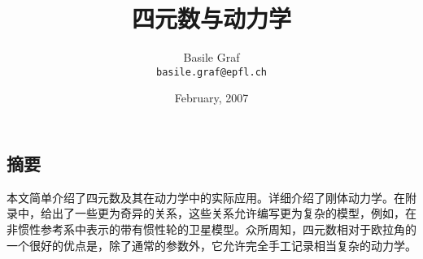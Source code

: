 \documentclass{article}
\renewcommand{\v}{\vec}
\begin{document}
\begin{CJK*}{UTF8}{gbsn}
%

\title{四元数与动力学}
\author{Basile Graf \\ \texttt{basile.graf@epfl.ch}}
\date{February, 2007}
\maketitle
\thispagestyle{empty}

\subsection*{摘要}
本文简单介绍了四元数及其在动力学中的实际应用。详细介绍了刚体动力学。在附录中，给出了一些更为奇异的关系，这些关系允许编写更为复杂的模型，例如，在非惯性参考系中表示的带有惯性轮的卫星模型。众所周知，四元数相对于欧拉角的一个很好的优点是，除了通常的参数外，它允许完全手工记录相当复杂的动力学。 

\pagebreak

\tableofcontents











\end{CJK*}
\end{document}

